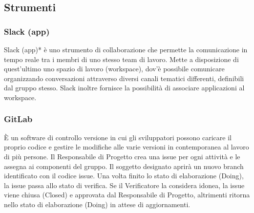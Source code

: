 \documentclass[11pt,a4paper]{article}
\begin{document}
\newpage

\subsection{Strumenti}

\subsubsection{Slack (app)}
Slack (app)* è uno strumento di collaborazione che permette la comunicazione in tempo reale tra i membri di uno stesso team di lavoro. Mette a disposizione di quest’ultimo uno spazio di lavoro (workspace), dov'è possibile comunicare organizzando conversazioni attraverso diversi canali tematici differenti, definibili dal gruppo stesso.
Slack inoltre fornisce la possibilità di associare applicazioni al workspace.

\subsubsection{GitLab}
È un software di controllo versione in cui gli sviluppatori possono caricare il proprio codice e gestire le modifiche alle varie versioni in contemporanea al lavoro di più persone.
Il Responsabile di Progetto crea una issue per ogni attività e le assegna ai componenti del gruppo. Il soggetto designato aprirà un nuovo branch identificato con il codice issue.
Una volta finito lo stato di elaborazione (Doing), la issue passa allo stato di verifica. Se il Verificatore la considera idonea, la issue viene chiusa (Closed) e approvata dal Responsabile di Progetto, altrimenti ritorna nello stato di elaborazione (Doing) in attese di aggiornamenti.
\end{document}
